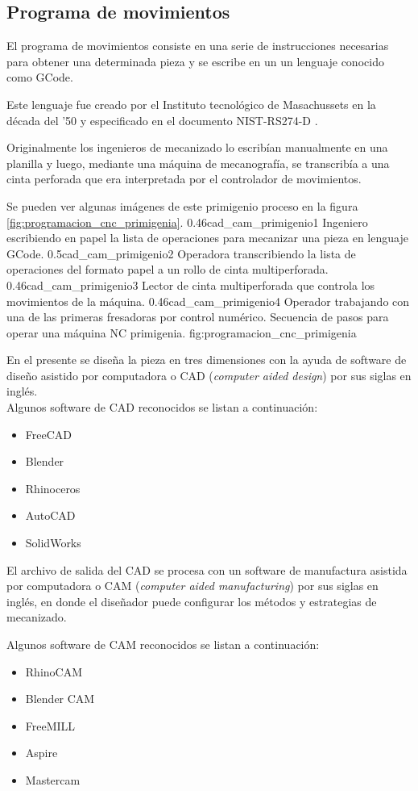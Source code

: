 \subsection{Programa de movimientos}
   El programa de movimientos consiste en una serie de instrucciones necesarias para obtener una determinada pieza y se escribe en un un lenguaje conocido como GCode\citep{WEBSITE:gcode_wiki}.\par
   Este lenguaje fue creado por el Instituto tecnológico de Masachussets en la década del '50 y especificado en el documento NIST-RS274-D \citep{rs274}.\par
Originalmente los ingenieros de mecanizado lo escribían manualmente en una planilla y luego, mediante una máquina de mecanografía, se transcribía a una cinta perforada que era interpretada por el controlador de movimientos.\par
Se pueden ver algunas imágenes de este primigenio proceso en la figura \ref{fig:programacion_cnc_primigenia}.
\subfigtwotwo
          {0.46}{cad_cam_primigenio1} {Ingeniero escribiendo en papel la lista de operaciones para mecanizar una pieza en lenguaje GCode.}
          {0.5}{cad_cam_primigenio2} {Operadora transcribiendo la lista de operaciones del formato papel a un rollo de cinta multiperforada.}
          {0.46}{cad_cam_primigenio3} {Lector de cinta multiperforada que controla los movimientos de la máquina.}
          {0.46}{cad_cam_primigenio4} {Operador trabajando con una de las primeras fresadoras por control numérico.}
          {Secuencia de pasos para operar una máquina NC primigenia.}
          {fig:programacion_cnc_primigenia}


          En el presente se diseña la pieza en tres dimensiones con la ayuda de software de diseño asistido por computadora o CAD (\textit{computer aided design}) por sus siglas en inglés.\\
          Algunos software de CAD reconocidos se listan a continuación:
          \begin{itemize}
             \item{FreeCAD}
             \item{Blender}
             \item{Rhinoceros}
             \item{AutoCAD}
             \item{SolidWorks}
          \end{itemize}
   El archivo de salida del CAD se procesa con un software de manufactura asistida por computadora o CAM (\textit{computer aided manufacturing}) por sus siglas en inglés, en donde el diseñador puede configurar los métodos y estrategias de mecanizado.\par
          Algunos software de CAM reconocidos se listan a continuación:
          \begin{itemize}
             \item{RhinoCAM}
             \item{Blender CAM}
             \item{FreeMILL}
             \item{Aspire}
             \item{Mastercam}
          \end{itemize}

